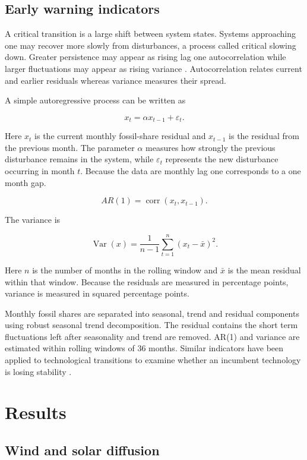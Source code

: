\documentclass[
]{krantz}
\begin{document}
\subsection*{Early warning indicators}\label{early-warning-indicators}


A critical transition is a large shift between system states. Systems approaching one may recover more slowly from disturbances, a process called critical slowing down. Greater persistence may appear as rising lag one autocorrelation while larger fluctuations may appear as rising variance \citep{scheffer2009}. Autocorrelation relates current and earlier residuals whereas variance measures their spread.

A simple autoregressive process can be written as

\[
x_t =
\alpha x_{t-1}
+\varepsilon_t.
\]

Here \(x_t\) is the current monthly fossil-share residual and \(x_{t-1}\) is the residual from the previous month. The parameter \(\alpha\) measures how strongly the previous disturbance remains in the system, while \(\varepsilon_t\) represents the new disturbance occurring in month \(t\). Because the data are monthly lag one corresponds to a one month gap.

\[
AR(1)=
\operatorname{corr}(x_t,x_{t-1}).
\]

The variance is

\[
\operatorname{Var}(x)=
\frac{1}{n-1}
\sum_{t=1}^{n}
(x_t-\bar{x})^2.
\]

Here \(n\) is the number of months in the rolling window and \(\bar{x}\) is the mean residual within that window. Because the residuals are measured in percentage points, variance is measured in squared percentage points.

Monthly fossil shares are separated into seasonal, trend and residual components using robust seasonal trend decomposition. The residual contains the short term fluctuations left after seasonality and trend are removed. AR(1) and variance are estimated within rolling windows of 36 months. Similar indicators have been applied to technological transitions to examine whether an incumbent technology is losing stability \citep{mercure2026}.

\section*{Results}\label{results-7}


\subsection*{Wind and solar diffusion}\label{wind-and-solar-diffusion}
\end{document}
